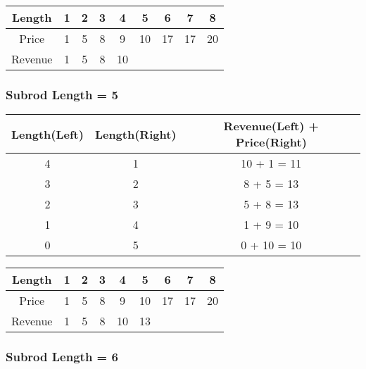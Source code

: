 \begin{table}[H]
	\centering
	\begin{tabular}{| c | c | c | c | c | c | c | c | c |}
		\hline
		Length
		&	1
		&	2
		&	3
		&	4
		&	5
		&	6
		&	7
		&	8\\
		\hline
		Price
		&	1
		&	5
		&	8
		&	9
		&	10
		&	17
		&	17
		&	20\\
		\hline
		Revenue
		&	1
		&	5
		&	8
		&	10
		&	
		&	
		&	
		&	\\
		\hline
	\end{tabular}
\end{table}

\subsubsection*{Subrod Length = 5}

\begin{table}[H]
	\centering
	\begin{tabular}{| c | c | c |}
		\hline
		Length(Left)	&	Length(Right)	&	Revenue(Left) + Price(Right)\\
		\hline
		4
		&	1
		&	10 + 1 = 11\\
		\hline
		3	
		&	2
		&	8 + 5 = 13\\
		\hline
		2
		&	3
		&	5 + 8 = 13\\
		\hline
		1
		&	4
		&	1 + 9 = 10\\
		\hline
		0
		&	5
		&	0 + 10 = 10\\
		\hline
	\end{tabular}	
\end{table}

\begin{table}[H]
	\centering
	\begin{tabular}{| c | c | c | c | c | c | c | c | c |}
		\hline
		Length
		&	1
		&	2
		&	3
		&	4
		&	5
		&	6
		&	7
		&	8\\
		\hline
		Price
		&	1
		&	5
		&	8
		&	9
		&	10
		&	17
		&	17
		&	20\\
		\hline
		Revenue
		&	1
		&	5
		&	8
		&	10
		&	13
		&	
		&	
		&	\\
		\hline
	\end{tabular}
\end{table}

\subsubsection*{Subrod Length = 6}

